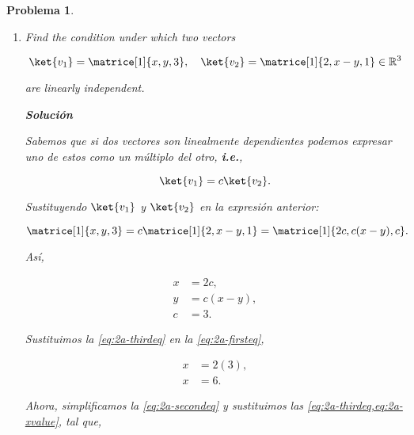 \documentclass[12pt]{article}
\theoremstyle{break}
\newtheorem{exercise}{Problema}
\theoremstyle{nonumberbreak}
\newcommand*{\inlinesol}{\vspace*{10pt}\textbf{Solución}\vspace*{10pt}}
\begin{document}
    \pagebreak
    \begin{exercise}
        \begin{enumerate}[label = (\alph*)]
            \item Find the condition under which two vectors
            
            \begin{equation*}
                \ket{v_{1}} = \matrice[1]{x, y, 3}, \quad \ket{v_{2}} = \matrice[1]{2, x - y, 1} \in \vecspace{R}[3]
            \end{equation*}

            are linearly independent.

            \inlinesol

            Sabemos que si dos vectores son linealmente dependientes podemos expresar uno de estos como un múltiplo del otro, \textbf{i.e.}, 

            \begin{equation*}
                \ket{v_{1}} = c\ket{v_{2}}\text{.}
            \end{equation*}

            Sustituyendo \(\ket{v_{1}}\) y \(\ket{v_{2}}\) en la expresión anterior:

            \begin{equation*}
                \matrice[1]{x, y, 3} = c\matrice[1]{2, x - y, 1} = \matrice[1]{2c, c(x - y), c}\text{.}
            \end{equation*}

            Así,

            \begin{align}
                x &= 2c,\label{eq:2a-firsteq}\\
                y &= c(x - y),\label{eq:2a-secondeq}\\
                c &= 3\text{.}\label{eq:2a-thirdeq}
            \end{align}

            Sustituimos la \cref{eq:2a-thirdeq} en la \cref{eq:2a-firsteq},

            \begin{align}
                x &= 2(3),\nonumber\\
                x &= 6\text{.}\label{eq:2a-xvalue}
            \end{align}

            Ahora, simplificamos la \cref{eq:2a-secondeq} y sustituimos las \cref{eq:2a-thirdeq,eq:2a-xvalue}, tal que,


\end{enumerate}
\end{exercise}
\end{document}

